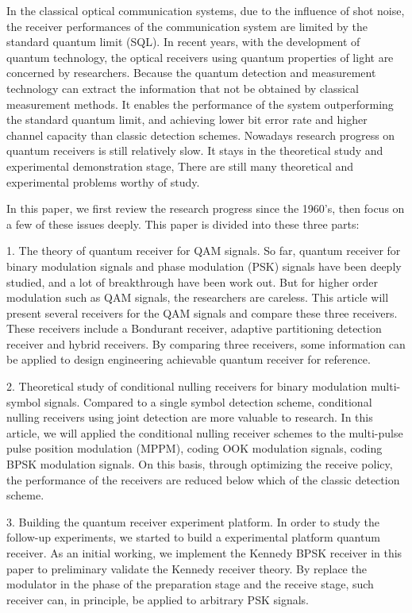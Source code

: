 \begin{enabstract}
In the classical optical communication systems, 
due to the influence of shot noise,
the receiver performances of the communication system  
are limited by the standard quantum limit (SQL).
In recent years, with the development of quantum technology, 
the optical receivers using quantum properties of light 
are concerned by researchers.
Because the quantum detection and measurement  technology can extract the information 
that not be obtained by classical measurement methods.
It enables the performance of the system outperforming the standard quantum limit,
and achieving lower bit error rate and higher channel capacity than classic detection schemes.
Nowadays research progress on quantum receivers is still relatively slow. 
It stays in the theoretical study and experimental demonstration stage,
There are still many theoretical and experimental problems worthy of study.


In this paper, we first review the research progress since the 1960's,
then focus on a few of these issues deeply. 
This paper is divided into these three parts:


1. The theory of quantum receiver for QAM signals.
So far, quantum receiver for binary modulation signals and phase modulation (PSK) signals 
have been deeply studied, and a lot of breakthrough have been work out.
But for higher order modulation such as QAM signals, the researchers are careless.
This article will present several receivers for the QAM signals and compare these three receivers.
These receivers include a  Bondurant receiver, 
adaptive partitioning detection receiver and hybrid receivers.
By comparing three receivers, some information can be applied to 
design engineering achievable quantum receiver for reference.

2. Theoretical study of conditional nulling receivers for binary modulation multi-symbol signals.
Compared to a single symbol detection scheme, conditional nulling receivers using joint detection  
are more valuable to research. In this article, we will applied the conditional nulling receiver schemes
to the multi-pulse pulse position modulation (MPPM), coding OOK modulation signals,
coding BPSK modulation signals. On this basis, through optimizing the receive policy,
the performance of the receivers are reduced below which of the classic detection scheme.

3. Building the quantum receiver experiment platform.
In order to study the follow-up experiments,
we started to build a experimental platform quantum receiver.
As an initial working, we implement the Kennedy BPSK receiver in this paper 
to preliminary validate the Kennedy receiver theory.
By replace the modulator in the phase of the preparation stage and the receive stage,
such receiver can, in principle, be applied to arbitrary PSK signals.

\end{enabstract}

